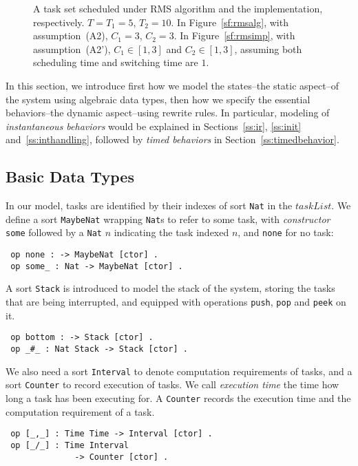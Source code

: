 \documentclass[10pt,journal]{IEEEtran}
\begin{document}
\begin{figure}[!t]
{
\label{sf:rmsimp}}
\caption{A task set scheduled under RMS algorithm and the
  implementation, respectively. $T=T_1=5$, $T_2=10$.  In
  Figure~\ref{sf:rmsalg}, with assumption~(A2), $C_1=3$, $C_2=3$. In
  Figure~\ref{sf:rmsimp}, with assumption~(A2'), $C_1\in [1,3]$ and
  $C_2\in [1,3]$, assuming both scheduling time and switching time are
  $1$.}
\label{f:example}
\end{figure}

In this section, we introduce first how we model the states--the
static aspect--of the system using algebraic data types, then how we
specify the essential behaviors--the dynamic aspect--using rewrite
rules. In particular, modeling of \emph{instantaneous behaviors} would
be explained in Sections~\ref{ss:ir}, \ref{ss:init}
and~\ref{ss:inthandling}, followed by \emph{timed behaviors} in
Section~\ref{ss:timedbehavior}.

\subsection{Basic Data Types}
In our model, tasks are identified by their indexes of sort \verb|Nat|
in the $taskList$. We define a sort \verb|MaybeNat| wrapping
\verb|Nat|s to refer to some task, with \emph{constructor} \verb|some|
followed by a \verb|Nat| $n$ indicating the task indexed $n$, and
\verb|none| for no task:
\begin{verbatim}
 op none : -> MaybeNat [ctor] .
 op some_ : Nat -> MaybeNat [ctor] .
\end{verbatim}

A sort \verb|Stack| is introduced to model the stack of the system,
storing the tasks that are being interrupted, and equipped with
operations \verb|push|, \verb|pop| and \verb|peek| on it.
\begin{verbatim}
 op bottom : -> Stack [ctor] .
 op _#_ : Nat Stack -> Stack [ctor] .
\end{verbatim}

We also need a sort \verb|Interval| to denote computation requirements
of tasks, and a sort \verb|Counter| to record execution of tasks.  We
call \emph{execution time} the time how long a task has been executing
for. A \verb|Counter| records the execution time and the computation
requirement of a task.
\begin{verbatim}
 op [_,_] : Time Time -> Interval [ctor] .  
 op [_/_] : Time Interval 
              -> Counter [ctor] .
\end{verbatim}
\end{document}
